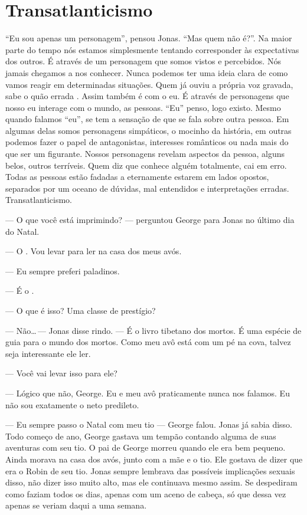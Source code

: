\chapter{Transatlanticismo}

``Eu sou apenas um personagem'', pensou Jonas. ``Mas quem não é?''. Na maior parte do tempo nós estamos simplesmente tentando corresponder às expectativas dos outros. É através de um personagem que somos vistos e percebidos. Nós jamais chegamos a nos conhecer. Nunca podemos ter uma ideia clara de como vamos reagir em determinadas situações. Quem já ouviu a própria voz gravada, sabe o quão errada . Assim também é com o eu. É através de personagens que nosso eu interage com o mundo,  as pessoas. ``Eu'' penso, logo existo. Mesmo quando falamos ``eu'', se tem a sensação de que se fala sobre outra pessoa. Em algumas delas somos personagens simpáticos, o mocinho da história, em outras podemos fazer o papel de antagonistas, interesses românticos ou nada mais do que ser um figurante. Nossos personagens revelam aspectos da pessoa, alguns belos, outros terríveis. Quem diz que conhece alguém totalmente, cai em erro. Todas as pessoas estão fadadas a eternamente estarem em lados opostos, separados por um oceano de dúvidas, mal entendidos e interpretações erradas. Transatlanticismo.

--- O que você está imprimindo? --- perguntou George para Jonas\mudanca{,} no último dia do Natal.

--- O . Vou levar para ler na casa dos meus avós.

--- Eu sempre preferi paladinos.

--- É o .

--- O que é isso? Uma classe de prestígio?

--- Não\ldots\,--- Jonas disse\mudanca{,} rindo. --- É o livro tibetano dos mortos. É uma espécie de guia para o mundo dos mortos. Como meu avô está com um pé na cova, talvez seja interessante ele ler.

--- Você vai levar isso para ele?

--- Lógico que não, George. Eu e meu avô praticamente nunca nos falamos. Eu não sou exatamente o neto predileto.

--- Eu sempre passo o Natal com meu tio --- George falou. Jonas já sabia disso. Todo começo de ano, George gastava um tempão contando alguma de suas aventuras com seu tio. O pai de George morreu quando ele era bem pequeno. Ainda morava na casa dos avós, junto com a mãe e o tio. Ele gostava de dizer que era o Robin de seu tio. Jonas sempre lembrava das possíveis implicações sexuais disso,  não dizer isso muito alto, mas ele continuava mesmo assim. Se despediram como faziam todos os dias, apenas com um aceno de cabeça, só que dessa vez apenas se veriam daqui a uma semana.

